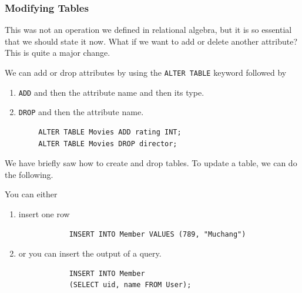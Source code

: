   \subsubsection{Modifying Tables}

    This was not an operation we defined in relational algebra, but it is so essential that we should state it now. What if we want to add or delete another attribute? This is quite a major change. 

    \begin{theorem}
      We can add or drop attributes by using the \texttt{ALTER TABLE} keyword followed by 
      \begin{enumerate}
        \item \texttt{ADD} and then the attribute name and then its type. 
        \item \texttt{DROP} and then the attribute name. 
      \end{enumerate}
      \begin{lstlisting}
        ALTER TABLE Movies ADD rating INT; 
        ALTER TABLE Movies DROP director; 
      \end{lstlisting}
    \end{theorem} 

    We have briefly saw how to create and drop tables. To update a table, we can do the following. 

    \begin{definition}
      You can either 
      \begin{enumerate}
        \item insert one row  
          \begin{lstlisting}
            INSERT INTO Member VALUES (789, "Muchang")
          \end{lstlisting} 
        \item or you can insert the output of a query. 
          \begin{lstlisting}
            INSERT INTO Member 
            (SELECT uid, name FROM User); 
          \end{lstlisting}
      \end{enumerate}
    \end{definition}

